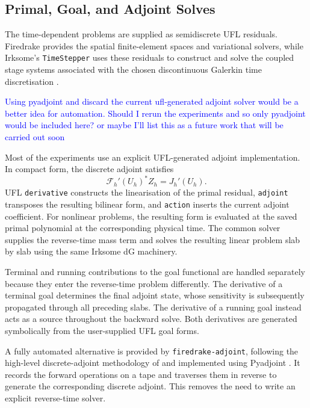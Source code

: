 \subsection{Primal, Goal, and Adjoint Solves}
\label{sec:primal-goal-adjoint-solves}

The time-dependent problems are supplied as semidiscrete UFL residuals. Firedrake provides the spatial finite-element spaces and variational solvers, while Irksome's \texttt{TimeStepper} uses these residuals to construct and solve the coupled stage systems associated with the chosen discontinuous Galerkin time discretisation \cite{andrews2026automatedgalerkintimestepping}.

\textcolor{blue}{Using pyadjoint and discard the current ufl-generated adjoint solver would be a better idea for automation. Should I rerun the experiments and so only pyadjoint would be included here? or maybe I'll list this as a future work that will be carried out soon}

Most of the experiments use an explicit UFL-generated adjoint implementation. In compact form, the discrete adjoint satisfies
\[
  \mathcal F_h'(U_h)^*Z_h=J_h'(U_h).
\]
UFL \texttt{derivative} constructs the linearisation of the primal residual, \texttt{adjoint} transposes the resulting bilinear form, and \texttt{action} inserts the current adjoint coefficient. For nonlinear problems, the resulting form is evaluated at the saved primal polynomial at the corresponding physical time. The common solver supplies the reverse-time mass term and solves the resulting linear problem slab by slab using the same Irksome dG machinery.

Terminal and running contributions to the goal functional are handled separately because they enter the reverse-time problem differently. The derivative of a terminal goal determines the final adjoint state, whose sensitivity is subsequently propagated through all preceding slabs. The derivative of a running goal instead acts as a source throughout the backward solve. Both derivatives are generated symbolically from the user-supplied UFL goal forms.

A fully automated alternative is provided by \texttt{firedrake-adjoint}, following the high-level discrete-adjoint methodology of \cite{Farrell_Ham_Funke_Rognes_2013} and implemented using Pyadjoint \cite{Mitusch2019}. It records the forward operations on a tape and traverses them in reverse to generate the corresponding discrete adjoint. This removes the need to write an explicit reverse-time solver.

